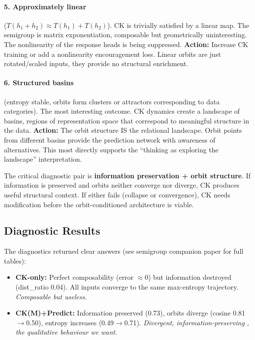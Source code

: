 \documentclass[11pt, a4paper]{article}
\theoremstyle{plain}
\theoremstyle{definition}
\theoremstyle{remark}
\begin{document}
\paragraph{5. Approximately linear} ($T(h_1 + h_2) \approx T(h_1) + T(h_2)$).
CK is trivially satisfied by a linear map.
The semigroup is matrix exponentiation, composable but geometrically uninteresting.
The nonlinearity of the response heads is being suppressed.
\textbf{Action:} Increase CK training or add a nonlinearity encouragement loss.
Linear orbits are just rotated/scaled inputs, they provide no structural enrichment.

\paragraph{6. Structured basins} (entropy stable, orbits form clusters or attractors corresponding to data categories).
The most interesting outcome.
CK dynamics create a landscape of basins, regions of representation space that correspond to meaningful structure in the data.
\textbf{Action:} The orbit structure IS the relational landscape.
Orbit points from different basins provide the prediction network with awareness of alternatives.
This most directly supports the ``thinking as exploring the landscape'' interpretation.

\medskip
\noindent
The critical diagnostic pair is \textbf{information preservation + orbit structure}.
If information is preserved and orbits neither converge nor diverge, CK produces useful structural context.
If either fails (collapse or convergence), CK needs modification before the orbit-conditioned architecture is viable.

\subsection{Diagnostic Results}\label{sec:ck-results}

The diagnostics returned clear answers (see semigroup companion paper for full tables):
\begin{itemize}[nosep]
    \item \textbf{CK-only:} Perfect composability (error ${\approx}0$) but information destroyed (dist\_ratio 0.04).
    All inputs converge to the same max-entropy trajectory. \emph{Composable but useless.}
    \item \textbf{CK(M)+Predict:} Information preserved (0.73), orbits diverge (cosine 0.81$\to$0.50), entropy increases (0.49$\to$0.71). \emph{Divergent, information-preserving ,  the qualitative behaviour we want.}
\end{itemize}
\end{document}
